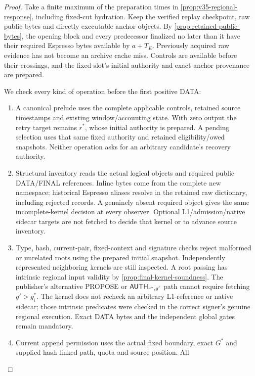 \begin{proof}
Take a finite maximum of the preparation times in
\cref{prop:v35-regional-response}, including fixed-cut hydration. Keep
the verified replay checkpoint, raw public bytes and directly executable
anchor objects. By \cref{prop:retained-public-bytes}, the opening block
and every predecessor finalized no later than it have their required
Espresso bytes available by $a+T_E$. Previously acquired raw evidence
has not become an archive cache miss. Controls are available before
their crossings, and the fixed slot's initial authority and exact anchor
provenance are prepared.

We check every kind of operation before the first positive DATA:
\begin{enumerate}[label=(\roman*),itemsep=2pt]
\item A canonical prelude uses the complete applicable controls,
retained source timestamps and existing window/accounting state. With
zero output the retry target remains $r^*$, whose initial authority
is prepared. A pending selection uses that same fixed authority and
retained eligibility/owed snapshots. Neither operation asks for an
arbitrary candidate's recovery authority.
\item Structural inventory reads the actual logical objects and
required public DATA/FINAL references. Inline bytes come from the
complete new namespace; historical Espresso aliases resolve in the
retained raw dictionary, including rejected records. A genuinely absent
required object gives the same incomplete-kernel decision at every
observer. Optional L1/admission/native sidecar targets are not fetched
to decide that kernel or to advance source inventory.
\item Type, hash, current-pair, fixed-context and signature checks
reject malformed or unrelated roots using the prepared initial snapshot.
Independently represented neighboring kernels are still inspected. A
root passing  has intrinsic regional input validity by
\cref{prop:final-kernel-soundness}. The publisher's alternative PROPOSE
or $\mathsf{AUTH}_{r^*,g'}$ path cannot require fetching $g'>g_i^*$.
The kernel does not recheck an arbitrary L1-reference or native sidecar;
those intrinsic predicates were checked in the correct signer's genuine
regional execution. Exact DATA bytes and the independent global gates
remain mandatory.
\item Current append permission uses the actual fixed boundary, exact
$G^*$ and supplied hash-linked path, quota and source position. All

\end{enumerate}
\end{proof}
